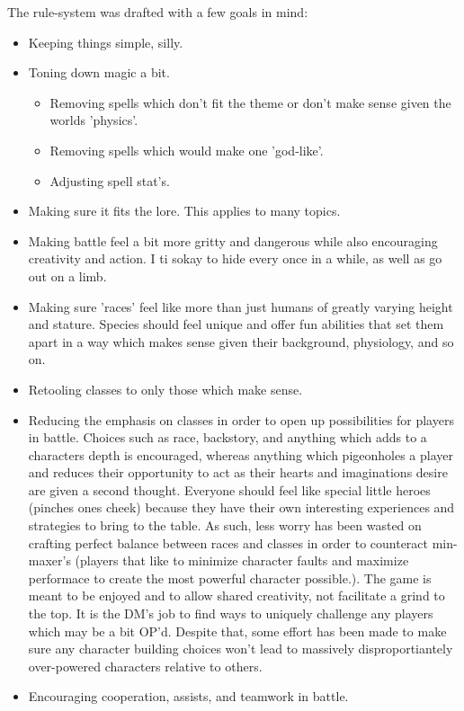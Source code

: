 \documentclass[twoside, 12pt, letterpaper]{report}\usepackage[]{graphicx}\usepackage[]{color}
\begin{document}
\begin{multicols*}{2}
The rule-system was drafted with a few goals in mind:
\begin{itemize}
\item Keeping things simple, silly.
\item Toning down magic a bit.
\begin{itemize}
\item Removing spells which don't fit the theme or don't make sense given the worlds 'physics'.
\item Removing spells which would make one 'god-like'.
\item Adjusting spell stat's.
\end{itemize}
\item Making sure it fits the lore. This applies to many topics.
\item Making battle feel a bit more gritty and dangerous while also encouraging creativity and action. I ti sokay to hide every once in a while, as well as go out on a limb.
\item Making sure 'races' feel like more than just humans of greatly varying height and stature. Species should feel unique and offer fun abilities that set them apart in a way which makes sense given their background, physiology, and so on.
\item Retooling classes to only those which make sense. 
\item Reducing the emphasis on classes in order to open up possibilities for players in battle. Choices such as race, backstory, and anything which adds to a characters depth is encouraged, whereas anything which pigeonholes a player and reduces their opportunity to act as their hearts and imaginations desire are given a second thought. Everyone should feel like special little heroes (pinches ones cheek) because they have their own interesting experiences and strategies to bring to the table. As such, less worry has been wasted on crafting perfect balance between races and classes in order to counteract min-maxer's (players that like to minimize character faults and maximize performace to create the most powerful character possible.). The game is meant to be enjoyed and to allow shared creativity, not facilitate a grind to the top. It is the DM's job to find ways to uniquely challenge any players which may be a bit OP'd. Despite that, some effort has been made to make sure any character building choices won't lead to massively disproportiantely over-powered characters relative to others.
\item Encouraging cooperation, assists, and teamwork in battle. 

\end{itemize}
\end{multicols*}
\end{document}
